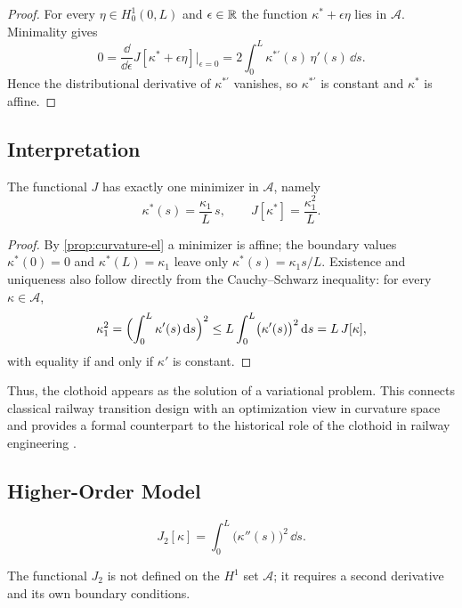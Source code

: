 \begin{proof}
For every \(\eta\in H_0^1(0,L)\) and \(\epsilon\in\mathbb{R}\) the function
\(\kappa^\ast+\epsilon\eta\) lies in \(\mathcal{A}\). Minimality gives
\[
0=\frac{\dd}{\dd\epsilon}J[\kappa^\ast+\epsilon\eta]\Big|_{\epsilon=0}
=2\int_0^L\kappa^{\ast\prime}(s)\,\eta'(s)\,\dd s .
\]
Hence the distributional derivative of \(\kappa^{\ast\prime}\) vanishes,
so \(\kappa^{\ast\prime}\) is constant and \(\kappa^\ast\) is affine.
\end{proof}

\subsection{Interpretation}

\begin{proposition}
\label{prop:curvature-el-minimizer}
The functional \(J\) has exactly one minimizer in \(\mathcal{A}\), namely
\[
\kappa^\ast(s)=\frac{\kappa_1}{L}\,s ,
\qquad
J[\kappa^\ast]=\frac{\kappa_1^2}{L}.
\]
\end{proposition}

\begin{proof}
By \cref{prop:curvature-el} a minimizer is affine; the boundary values
\(\kappa^\ast(0)=0\) and \(\kappa^\ast(L)=\kappa_1\) leave only
\(\kappa^\ast(s)=\kappa_1 s/L\). Existence and uniqueness also follow
directly from the Cauchy--Schwarz inequality: for every
\(\kappa\in\mathcal{A}\),
\[
\kappa_1^2
=\Bigl(\int_0^L\kappa'(s)\,\mathrm{d} s\Bigr)^2
\le L\int_0^L\bigl(\kappa'(s)\bigr)^2\,\mathrm{d} s
= L\,J[\kappa],
\]
with equality if and only if \(\kappa'\) is constant.
\end{proof}

Thus, the clothoid appears as the solution of a variational problem.
This connects classical railway transition design with an optimization
view in curvature space and provides a formal counterpart to the
historical role of the clothoid in railway engineering
\cite{Glover1900TransitionCurves,Higgins1922TransitionSpiral}.

\subsection{Higher-Order Model}

\begin{definition}
\[
J_2[\kappa]
=
\int_0^L \bigl(\kappa''(s)\bigr)^2 \,\dd s.
\]
\end{definition}

The functional \(J_2\) is not defined on the \(H^1\) set \(\mathcal{A}\);
it requires a second derivative and its own boundary conditions.

